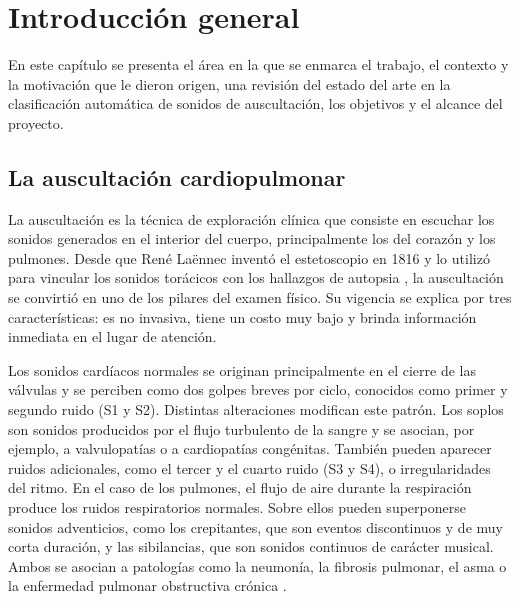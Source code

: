 
\chapter{Introducción general} %

\label{Chapter1} %
\label{IntroGeneral}

En este capítulo se presenta el área en la que se enmarca el trabajo, el contexto y la motivación
que le dieron origen, una revisión del estado del arte en la clasificación automática de sonidos de
auscultación, los objetivos y el alcance del proyecto.


\section{La auscultación cardiopulmonar}
\label{sec:auscultacion}

La auscultación es la técnica de exploración clínica que consiste en escuchar los sonidos generados
en el interior del cuerpo, principalmente los del corazón y los pulmones. Desde que René Laënnec
inventó el estetoscopio en 1816 y lo utilizó para vincular los sonidos torácicos con los hallazgos
de autopsia \citep{roguin2006laennec}, la auscultación se convirtió en uno de los pilares del examen
físico. Su vigencia se explica por tres características: es no invasiva, tiene un costo muy bajo y
brinda información inmediata en el lugar de atención.

Los sonidos cardíacos normales se originan principalmente en el cierre de las válvulas y se perciben
como dos golpes breves por ciclo, conocidos como primer y segundo ruido (S1 y S2). Distintas
alteraciones modifican este patrón. Los soplos son sonidos producidos por el flujo turbulento de la
sangre y se asocian, por ejemplo, a valvulopatías o a cardiopatías congénitas. También pueden
aparecer ruidos adicionales, como el tercer y el cuarto ruido (S3 y S4), o irregularidades del
ritmo. En el caso de los pulmones, el flujo de aire durante la respiración produce los ruidos
respiratorios normales. Sobre ellos pueden superponerse sonidos adventicios, como los crepitantes,
que son eventos discontinuos y de muy corta duración, y las sibilancias, que son sonidos continuos
de carácter musical. Ambos se asocian a patologías como la neumonía, la fibrosis pulmonar, el asma o
la enfermedad pulmonar obstructiva crónica \citep{bohadana2014fundamentals}.

